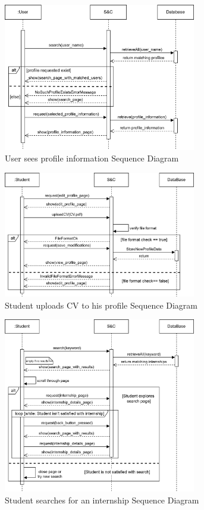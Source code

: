 \begin{figure}[H]
    \centering
    \includegraphics[width=0.75\textwidth]{Images/Sequence_Diagrams/seeProfile_SD.png}
    \caption{User sees profile information Sequence Diagram}
\end{figure}
\begin{figure}[H]
    \centering
    \includegraphics[width=0.75\textwidth]{Images/Sequence_Diagrams/uploadCV_SD.png}
    \caption{Student uploads CV to his profile Sequence Diagram}
\end{figure}
\begin{figure}[H]
    \centering
    \includegraphics[width=0.75\textwidth]{Images/Sequence_Diagrams/searchInt_SD.png}
    \caption{Student searches for an internship Sequence Diagram}
\end{figure}

